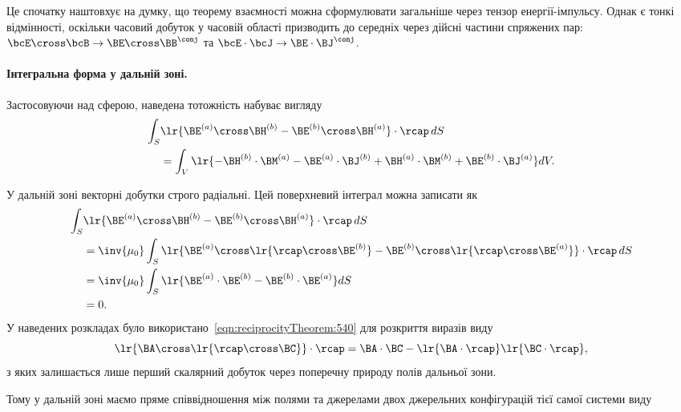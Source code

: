 Це спочатку наштовхує на думку, що теорему взаємності можна сформулювати загальніше через тензор енергії-імпульсу.
Однак є тонкі відмінності, оскільки часовий добуток у часовій області призводить до середніх через дійсні частини спряжених пар: \(\bcE \cross \bcB \to \BE \cross \BB^\conj\) та \(\bcE \cdot \bcJ \to \BE \cdot \BJ^\conj\).

\paragraph{Інтегральна форма у дальній зоні.}
Застосовуючи  над сферою, наведена тотожність набуває вигляду
\begin{equation}\label{eqn:reciprocityTheorem:480}
\begin{aligned}
\int_S
&\lr{\BE^{(a)} \cross \BH^{(b)} - \BE^{(b)} \cross \BH^{(a)}} \cdot \rcap\, dS \\
&=
\int_V \lr{
-\BH^{(b)} \cdot \BM^{(a)} - \BE^{(a)} \cdot \BJ^{(b)}
+\BH^{(a)} \cdot \BM^{(b)} + \BE^{(b)} \cdot \BJ^{(a)}
} dV.
\end{aligned}
\end{equation}

У дальній зоні векторні добутки строго радіальні. Цей поверхневий інтеграл можна записати як
\begin{equation}\label{eqn:reciprocityTheorem:500}
\begin{aligned}
\int_S
&\lr{\BE^{(a)} \cross \BH^{(b)} - \BE^{(b)} \cross \BH^{(a)}} \cdot \rcap\, dS \\
&=
\inv{\mu_0}
\int_S
\lr{\BE^{(a)} \cross \lr{\rcap \cross \BE^{(b)}} - \BE^{(b)} \cross \lr{\rcap \cross \BE^{(a)}}} \cdot \rcap\, dS
\\ &=
\inv{\mu_0}
\int_S
\lr{\BE^{(a)} \cdot \BE^{(b)} - \BE^{(b)} \cdot \BE^{(a)}} dS
\\ &= 0.
\end{aligned}
\end{equation}
У наведених розкладах було використано~\cref{eqn:reciprocityTheorem:540} для розкриття виразів виду
\begin{equation}\label{eqn:reciprocityTheorem:560}
\lr{\BA \cross \lr{\rcap \cross \BC}} \cdot \rcap
= \BA \cdot \BC - \lr{\BA \cdot \rcap} \lr{\BC \cdot \rcap},
\end{equation}
з яких залишається лише перший скалярний добуток через  поперечну природу полів дальньої зони.

Тому у дальній зоні маємо пряме співвідношення між полями та джерелами двох джерельних конфігурацій тієї самої системи виду

